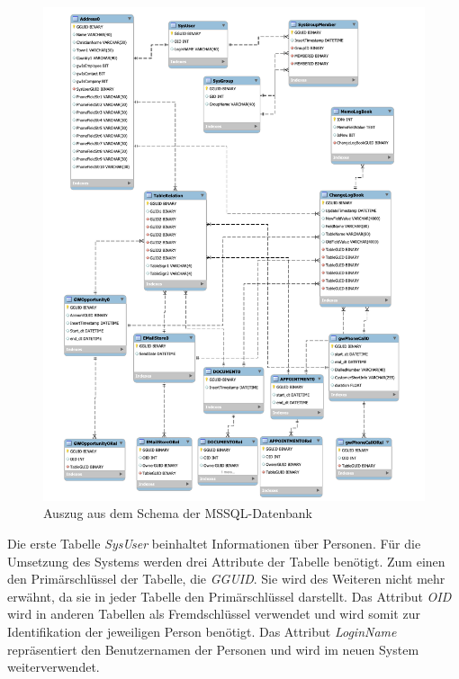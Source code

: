\begin{figure}[H]
	\centering
  \includegraphics[width=1.0\textwidth]{pics/schema_alt.pdf}
	\caption{Auszug aus dem Schema der MSSQL-Datenbank}
	\label{gw_schema_alt}
\end{figure}

Die erste Tabelle \textit{SysUser} beinhaltet Informationen über Personen. Für die Umsetzung des Systems werden drei Attribute der Tabelle benötigt. Zum einen den Primärschlüssel der Tabelle, die \textit{GGUID}. Sie wird des Weiteren nicht mehr erwähnt, da sie in jeder Tabelle den Primärschlüssel darstellt. Das Attribut \textit{OID} wird in anderen Tabellen als Fremdschlüssel verwendet und wird somit zur Identifikation der jeweiligen Person benötigt. Das Attribut \textit{LoginName} repräsentiert den Benutzernamen der Personen und wird im neuen System weiterverwendet. 

